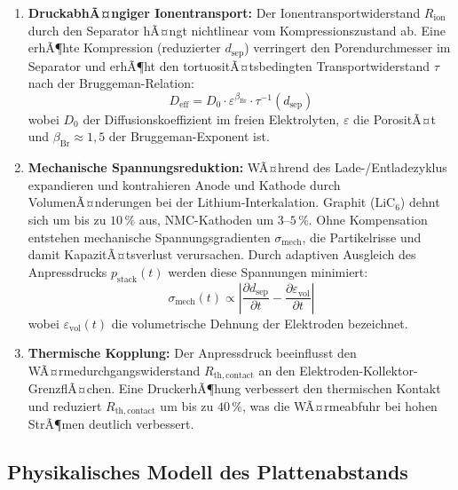 ﻿\documentclass[12pt,a4paper]{article}
\begin{document}
\begin{enumerate}[leftmargin=*, label=(\arabic*)]
	\item \textbf{DruckabhÃ¤ngiger Ionentransport:} Der Ionentransportwiderstand $R_\mathrm{ion}$
	durch den Separator hÃ¤ngt nichtlinear vom Kompressionszustand ab. Eine erhÃ¶hte
	Kompression (reduzierter $d_\mathrm{sep}$) verringert den Porendurchmesser im
	Separator und erhÃ¶ht den tortuositÃ¤tsbedingten Transportwiderstand $\tau$
	nach der Bruggeman-Relation:
	\begin{equation}
		D_\mathrm{eff} = D_0 \cdot \varepsilon^{\beta_\mathrm{Br}} \cdot \tau^{-1}(d_\mathrm{sep})
		\label{eq:bruggeman}
	\end{equation}
	wobei $D_0$ der Diffusionskoeffizient im freien Elektrolyten, $\varepsilon$ die
	PorositÃ¤t und $\beta_\mathrm{Br} \approx 1{,}5$ der Bruggeman-Exponent ist.

	\item \textbf{Mechanische Spannungsreduktion:} WÃ¤hrend des Lade-/Entladezyklus
	expandieren und kontrahieren Anode und Kathode durch VolumenÃ¤nderungen bei der
	Lithium-Interkalation. Graphit ($\mathrm{LiC_6}$) dehnt sich um bis zu $10\,\%$
	aus, NMC-Kathoden um $3\text{--}5\,\%$. Ohne Kompensation entstehen mechanische
	Spannungsgradienten $\sigma_\mathrm{mech}$, die Partikelrisse und damit
	KapazitÃ¤tsverlust verursachen. Durch adaptiven Ausgleich des Anpressdrucks
	$p_\mathrm{stack}(t)$ werden diese Spannungen minimiert:
	\begin{equation}
		\sigma_\mathrm{mech}(t) \propto \left|\frac{\partial d_\mathrm{sep}}{\partial t}
		- \frac{\partial \varepsilon_\mathrm{vol}}{\partial t}\right|
		\label{eq:mech_stress}
	\end{equation}
	wobei $\varepsilon_\mathrm{vol}(t)$ die volumetrische Dehnung der Elektroden
	bezeichnet.

	\item \textbf{Thermische Kopplung:} Der Anpressdruck beeinflusst den
	WÃ¤rmedurchgangswiderstand $R_\mathrm{th,contact}$ an den Elektroden-Kollektor-GrenzflÃ¤chen.
	Eine DruckerhÃ¶hung verbessert den thermischen Kontakt und reduziert
	$R_\mathrm{th,contact}$ um bis zu $40\,\%$, was die WÃ¤rmeabfuhr bei hohen
	StrÃ¶men deutlich verbessert.
\end{enumerate}

\subsection{Physikalisches Modell des Plattenabstands}
\end{document}
